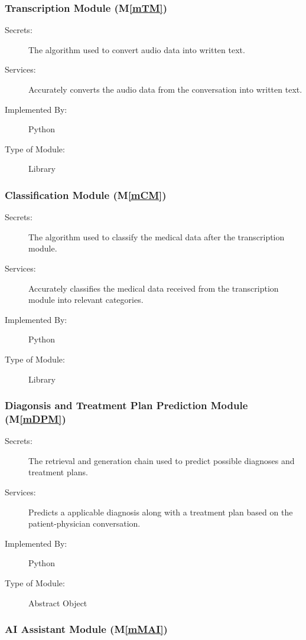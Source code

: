 \documentclass[12pt, titlepage]{article}
\newcommand{\mref}[1]{M\ref{#1}}
\begin{document}
\subsubsection{Transcription Module (\mref{mTM})}

\begin{description}
\item[Secrets:]The algorithm used to convert audio data into written text.
\item[Services:]Accurately converts the audio data from the conversation into written text.   
\item[Implemented By:]Python
\item[Type of Module:]Library
\end{description}

\subsubsection{Classification Module (\mref{mCM})}

\begin{description}
\item[Secrets:]The algorithm used to classify the medical data after the transcription module.
\item[Services:]Accurately classifies the medical data received from the transcription module into relevant categories.
\item[Implemented By:]Python
\item[Type of Module:]Library
\end{description}

\subsubsection{Diagonsis and Treatment Plan Prediction Module (\mref{mDPM})}

\begin{description}
\item[Secrets:]The retrieval and generation chain used to predict possible diagnoses and treatment plans.
\item[Services:]Predicts a applicable diagnosis along with a treatment plan based on the patient-physician conversation.
\item[Implemented By:]Python
\item[Type of Module:]Abstract Object
\end{description}

\subsubsection{AI Assistant Module (\mref{mMAI})}
\end{document}

